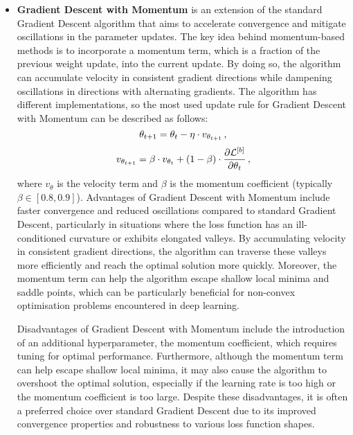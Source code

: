 \begin{itemize}[leftmargin=1.5em]
    \item\textbf{Gradient Descent with Momentum} is an extension of the standard Gradient Descent algorithm that aims to accelerate convergence and mitigate oscillations in the parameter updates. The key idea behind momentum-based methods is to incorporate a momentum term, which is a fraction of the previous weight update, into the current update. By doing so, the algorithm can accumulate velocity in consistent gradient directions while dampening oscillations in directions with alternating gradients. The algorithm has different implementations, so the most used update rule for Gradient Descent with Momentum can be described as follows:
    \begin{equation}
        \theta_{t+1} = \theta_{t} - \eta\cdot v_{\theta_{t+1}}\,,
    \end{equation}
    \begin{equation}
        v_{\theta_{t+1}} = \beta\cdot v_{\theta_{t}} + \left( 1 - \beta \right)\cdot \dfrac{\partial \mathcal{L}^{[b]}}{\partial \theta_{t}}\,,
    \end{equation}
    where $v_\theta$ is the velocity term and $\beta$ is the momentum coefficient (typically $\beta \in [0.8, 0.9]$). Advantages of Gradient Descent with Momentum include faster convergence and reduced oscillations compared to standard Gradient Descent, particularly in situations where the loss function has an ill-conditioned curvature or exhibits elongated valleys. By accumulating velocity in consistent gradient directions, the algorithm can traverse these valleys more efficiently and reach the optimal solution more quickly. Moreover, the momentum term can help the algorithm escape shallow local minima and saddle points, which can be particularly beneficial for non-convex optimisation problems encountered in deep learning.

    Disadvantages of Gradient Descent with Momentum include the introduction of an additional hyperparameter, the momentum coefficient, which requires tuning for optimal performance. Furthermore, although the momentum term can help escape shallow local minima, it may also cause the algorithm to overshoot the optimal solution, especially if the learning rate is too high or the momentum coefficient is too large. Despite these disadvantages, it is often a preferred choice over standard Gradient Descent due to its improved convergence properties and robustness to various loss function shapes.


\end{itemize}
